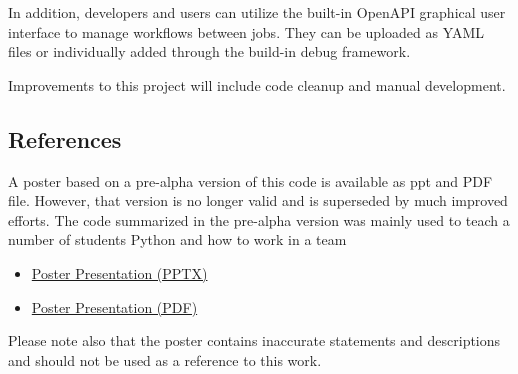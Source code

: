 In addition, developers and users can utilize the built-in OpenAPI
graphical user interface to manage workflows between jobs. They can be
uploaded as YAML files or individually added through the build-in debug
framework.

Improvements to this project will include code cleanup and manual
development.

\subsection{References}\label{references}

A poster based on a pre-alpha version of this code is available as ppt
and PDF file. However, that version is no longer valid and is superseded
by much improved efforts. The code summarized in the pre-alpha version
was mainly used to teach a number of students Python and how to work in
a team

\begin{itemize}
\tightlist
\item
  \href{https://github.com/cloudmesh/cloudmesh-cc/raw/main/documents/analytics-service.pptx}{Poster
  Presentation (PPTX)}
\item
  \href{https://github.com/cloudmesh/cloudmesh-cc/raw/main/documents/analytics-service.pdf}{Poster
  Presentation (PDF)}
\end{itemize}

Please note also that the poster contains inaccurate statements and
descriptions and should not be used as a reference to this work.

